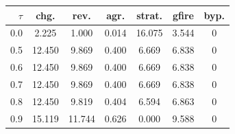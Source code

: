 \begin{tabular}{rcccccc}\toprule
$\tau$ & chg. & rev. & agr. & strat. & gfire & byp.\\
\midrule
0.0 & 2.225 & 1.000 & 0.014 & 16.075 & 3.544 & 0 \\
0.5 & 12.450 & 9.869 & 0.400 & 6.669 & 6.838 & 0 \\
0.6 & 12.450 & 9.869 & 0.400 & 6.669 & 6.838 & 0 \\
0.7 & 12.450 & 9.869 & 0.400 & 6.669 & 6.838 & 0 \\
0.8 & 12.450 & 9.819 & 0.404 & 6.594 & 6.863 & 0 \\
0.9 & 15.119 & 11.744 & 0.626 & 0.000 & 9.588 & 0 \\
\bottomrule
\end{tabular}
